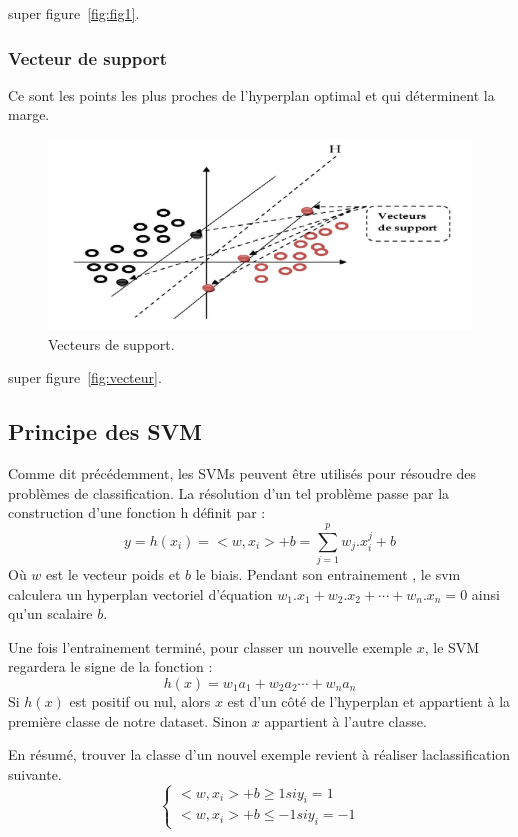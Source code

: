 super figure~\ref{fig:fig1}.

 \subsubsection{Vecteur de support}
Ce sont les points les plus proches de l’hyperplan optimal et qui déterminent la marge.

\begin{figure}[h!]
\begin{center}
\includegraphics[width=14cm]
{images/vecteurs.png}
\caption{Vecteurs de support.\label{}}
\end{center}
\end{figure}

super figure~\ref{fig:vecteur}.

\subsection{Principe des SVM}

Comme dit précédemment, les SVMs peuvent être utilisés pour résoudre des
problèmes de classification. La résolution d'un tel problème passe par la
construction d'une fonction h définit par :
\[
  y = h(x_i) = <w, x_i> + b = \sum_{j=1}^p w_j.x_i^j + b
\]
Où $w$ est le vecteur poids et $b$ le biais.  
Pendant son entrainement , le svm calculera un hyperplan vectoriel d'équation
$w_1.x_1 + w_2.x_2 + \cdots + w_n.x_n = 0$ ainsi qu'un scalaire $b$.

Une fois l'entrainement terminé, pour classer un nouvelle exemple $x$, le SVM
regardera le signe de la fonction :
$$ h(x) = w_1a_1 + w_2a_2  \cdots +w_na_n $$
Si $h(x)$ est positif ou nul, alors $x$ est d'un côté de l'hyperplan et
appartient à la première classe de notre dataset. Sinon $x$ appartient à l'autre
classe.

En résumé, trouver la classe d'un nouvel exemple revient à réaliser
laclassification suivante.
\[
\left\{
  \begin{array}{rcr}
    <w, x_i> + b \ge 1  si y_i =1 \\
    <w, x_i> + b \le -1  si  y_i = -1 
  \end{array}
\right.
\]

